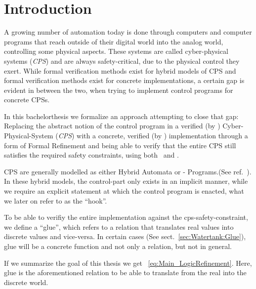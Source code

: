 
\chapter{Introduction}
\label{ch:Introduction}

A growing number of automation today is done through computers and computer programs that reach outside of their digital world into the analog world, controlling some physical aspects. These systems are called cyber-physical systems (\textit{CPS}) and are always safety-critical, due to the physical control they exert. While formal verification methods exist for hybrid models of CPS and formal verification methods exist for concrete implementations, a certain gap is evident in between the two, when trying to implement control programs for concrete CPSs.

In this bachelorthesis we formalize an approach attempting to close that gap: Replacing the abstract notion of the control program in a verified (by \keym) Cyber-Physical-System (\textit{CPS}) with a concrete, verified (by \key) implementation through a form of Formal Refinement and being able to verify that the entire CPS still satisfies the required safety constraints, using both \keym~and \key. 

CPS are generally modelled as either Hybrid Automata or - Programs.(See ref.~\cite{platzer2010b}). In these hybrid models, the control-part only exists in an implicit manner, while we require an explicit statement at which the control program is enacted, what we later on refer to as the ``hook''.  

To be able to verifiy the entire implementation against the cps-safety-constraint, we define a ``glue'', which refers to a relation that translates real values into discrete values and vice-versa. In certain cases (See sect.~\ref{sec:Watertank:Glue}), glue will be a concrete function and not only a relation, but not in general.

If we summarize the goal of this thesis we get ~\ref{eq:Main_LogicRefinement}. Here, glue is the aforementioned relation to be able to translate from the real into the discrete world.


